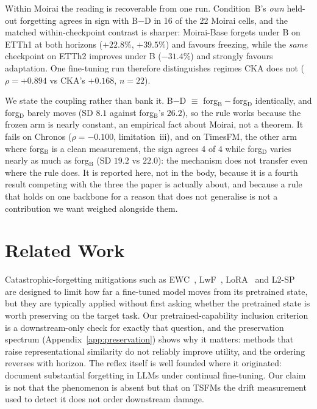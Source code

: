 \documentclass{article}
\begin{document}
Within Moirai the reading is recoverable from one run. Condition~B's \emph{own} held-out
forgetting agrees in sign with B$-$D in 16 of the 22 Moirai cells, and
the matched within-checkpoint contrast is sharper: Moirai-Base forgets under B on ETTh1 at both
horizons ($+22.8\%$, $+39.5\%$) and favours freezing, while the \emph{same} checkpoint on ETTh2
improves under B ($-31.4\%$) and strongly favours adaptation. One fine-tuning run therefore
distinguishes regimes CKA does not ($\rho{=}{+}0.894$ vs CKA's $+0.168$, $n{=}22$).

We state the coupling rather than bank it. B$-$D $\equiv$ forg$_\text{B}-$forg$_\text{D}$
identically, and forg$_\text{D}$ barely moves (SD $8.1$ against forg$_\text{B}$'s $26.2$), so the
rule works because the frozen arm is nearly constant, an empirical fact about Moirai, not a theorem.
It fails on Chronos ($\rho{=}{-}0.100$, limitation~iii), and on TimesFM, the other arm where
forg$_\text{B}$ is a clean measurement, the sign agrees 4 of 4 while forg$_\text{D}$ varies nearly
as much as forg$_\text{B}$ (SD $19.2$ vs $22.0$): the mechanism does not transfer even where the rule
does. It is reported here, not in the body, because it is a fourth result competing with the three
the paper is actually about, and because a rule that holds on one backbone for a reason that does not
generalise is not a contribution we want weighed alongside them.

\section{Related Work}
\label{app:related}

Catastrophic-forgetting mitigations such as EWC~\citep{kirkpatrick2017ewc},
LwF~\citep{li2017lwf}, LoRA~\citep{hu2022lora} and L2-SP~\citep{li2018l2sp} are designed to limit
how far a fine-tuned model moves from its pretrained state, but they are typically applied
without first asking whether the pretrained state is worth preserving on the target task. Our
pretrained-capability inclusion criterion is a downstream-only check for exactly that question, and the
preservation spectrum (Appendix~\ref{app:preservation}) shows why it matters: methods that raise
representational similarity do not reliably improve utility, and the ordering reverses with
horizon. The reflex itself is well founded where it originated: \citet{luo2023forgetting} document
substantial forgetting in LLMs under continual fine-tuning. Our claim is not that the phenomenon is
absent but that on TSFMs the drift measurement used to detect it does not order downstream damage.
\end{document}

